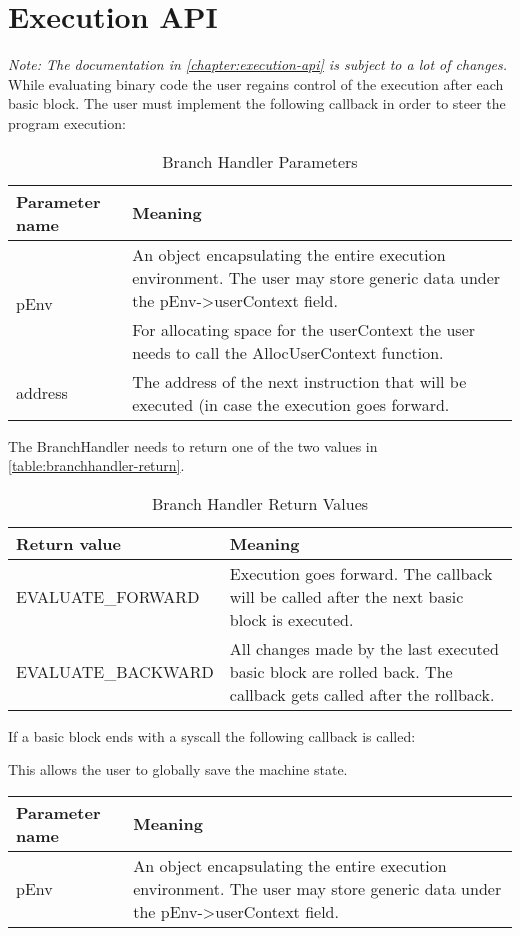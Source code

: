 \documentclass[12pt]{report}
\begin{document}
\chapter{Execution API}
\label{chapter:execution-api}
\textit{Note: The documentation in \autoref{chapter:execution-api} is subject to a lot of changes.}\\
While evaluating binary code the user regains control of the execution after each basic block. The user must implement the following callback in order to steer the program execution:

\begin{table}[H]
	\begin{tabular}{| p{6cm} | p{10cm} |}
		\hline
		\textbf{Parameter name} & \textbf{Meaning}\\ \hline
		\multirow{2}{*}{pEnv} & An object encapsulating the entire execution environment. The user may store generic data under the pEnv->userContext field.\\
		& For allocating space for the userContext the user needs to call the AllocUserContext function.\\ \hline
		address & The address of the next instruction that will be executed (in case the execution goes forward.\\ \hline
	\end{tabular}
	\caption{Branch Handler Parameters}
\end{table}
The BranchHandler needs to return one of the two values in \autoref{table:branchhandler-return}.\\
\begin{table}[H]
	\begin{tabular}{| p{6cm} | p{10cm} |}
		\hline
		\textbf{Return value} & \textbf{Meaning}\\ \hline
		EVALUATE_FORWARD & Execution goes forward. The callback will be called after the next basic block is executed.\\ \hline
		EVALUATE_BACKWARD & All changes made by the last executed basic block are rolled back. The callback gets called after the rollback.\\ \hline
	\end{tabular}
	\label{table:branchhandler-return}
	\caption{Branch Handler Return Values}
\end{table}
If a basic block ends with a syscall the following callback is called:

This allows the user to globally save the machine state.\\
\begin{tabular}{| p{6cm} | p{10cm} |}
	\hline
	\textbf{Parameter name} & \textbf{Meaning}\\ \hline
	pEnv & An object encapsulating the entire execution environment. The user may store generic data under the pEnv->userContext field.\\ \hline
\end{tabular}

\appendix
\end{document}
